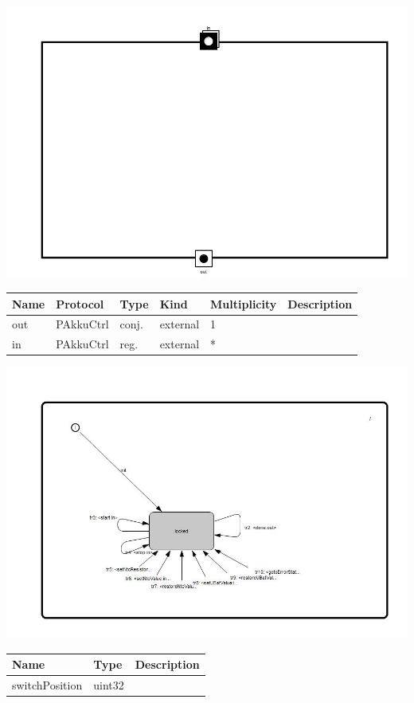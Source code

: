 
{
\centering{}
\includegraphics[width=1.0\textwidth]{./images/AAkkuCtrlMux_structure.jpg}
}

\begin{tabular}[ht]{|l|l|l|l|l|p{5cm}|}
\hline
\textbf{Name} & \textbf{Protocol} & \textbf{Type} & \textbf{Kind} & \textbf{Multiplicity} & \textbf{Description}\\
\hline
out & PAkkuCtrl & conj. & external & 1 & \\
\hline
in & PAkkuCtrl & reg. & external & * & \\
\hline
\end{tabular}

{
\centering{}
\includegraphics[width=1.0\textwidth]{./images/AAkkuCtrlMux_behavior.jpg}
}

\begin{par}

\end{par}


\begin{tabular}[ht]{|l|l|p{8cm}|}
\hline
\textbf{Name} & \textbf{Type} & \textbf{Description}\\
\hline
switchPosition & uint32 & \\
\hline
\end{tabular}

